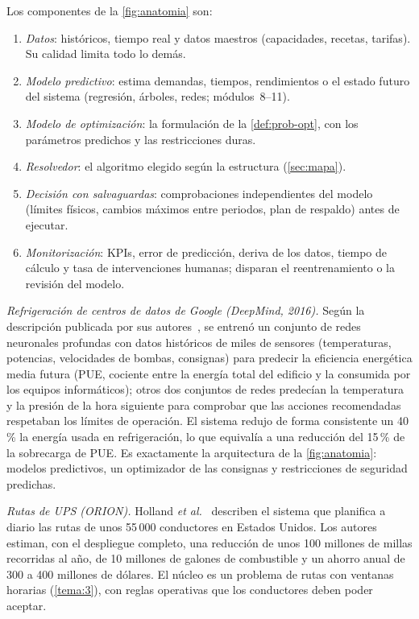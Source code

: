 Los componentes de la \cref{fig:anatomia} son:
\begin{enumerate}[label=\arabic*.]
  \item \emph{Datos}: históricos, tiempo real y datos maestros (capacidades, recetas, tarifas). Su calidad limita todo lo demás.
  \item \emph{Modelo predictivo}: estima demandas, tiempos, rendimientos o el estado futuro del sistema (regresión, árboles, redes; módulos~8--11).
  \item \emph{Modelo de optimización}: la formulación de la \cref{def:prob-opt}, con los parámetros predichos y las restricciones duras.
  \item \emph{Resolvedor}: el algoritmo elegido según la estructura (\cref{sec:mapa}).
  \item \emph{Decisión con salvaguardas}: comprobaciones independientes del modelo (límites físicos, cambios máximos entre periodos, plan de respaldo) antes de ejecutar.
  \item \emph{Monitorización}: KPIs, error de predicción, deriva de los datos, tiempo de cálculo y tasa de intervenciones humanas; disparan el reentrenamiento o la revisión del modelo.
\end{enumerate}

\begin{ejemplo}\label{ej:casos-reales}
\emph{Refrigeración de centros de datos de Google (DeepMind, 2016).} Según la descripción publicada por sus autores~\cite{deepmind}, se entrenó un conjunto de redes neuronales profundas con datos históricos de miles de sensores (temperaturas, potencias, velocidades de bombas, consignas) para predecir la eficiencia energética media futura (PUE, cociente entre la energía total del edificio y la consumida por los equipos informáticos); otros dos conjuntos de redes predecían la temperatura y la presión de la hora siguiente para comprobar que las acciones recomendadas respetaban los límites de operación. El sistema redujo de forma consistente un 40\,\% la energía usada en refrigeración, lo que equivalía a una reducción del 15\,\% de la sobrecarga de PUE. Es exactamente la arquitectura de la \cref{fig:anatomia}: modelos predictivos, un optimizador de las consignas y restricciones de seguridad predichas.

\emph{Rutas de UPS (ORION).} Holland \emph{et al.}~\cite{orion} describen el sistema que planifica a diario las rutas de unos 55\,000 conductores en Estados Unidos. Los autores estiman, con el despliegue completo, una reducción de unos 100 millones de millas recorridas al año, de 10 millones de galones de combustible y un ahorro anual de 300 a 400 millones de dólares. El núcleo es un problema de rutas con ventanas horarias (\cref{tema:3}), con reglas operativas que los conductores deben poder aceptar.
\end{ejemplo}

